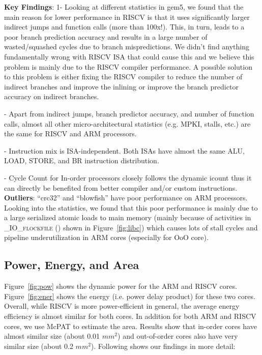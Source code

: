 \noindent \textbf{Key Findings}: 1- Looking at different statistics in gem5, we found that the main reason for lower performance in RISCV is that it uses significantly larger indirect jumps and function calls (more than 100x!). This, in turn, leads to a poor branch prediction accuracy and results in a large number of wasted/squashed cycles due to branch mispredictions. We didn't find anything fundamentally wrong with RISCV ISA that could cause this and we believe this problem is mainly due to the RISCV compiler performance. A possible solution to this problem is either fixing the RISCV compiler to reduce the number of indirect branches and improve the inlining or improve the branch predictor accuracy on indirect branches. 

- Apart from indirect jumps, branch predictor accuracy, and number of function calls, almost all other micro-architectural statistics (e.g. MPKI, stalls, etc.) are the same for RISCV and ARM processors.

- Instruction mix is ISA-independent. Both ISAs have almost the same ALU, LOAD, STORE, and BR instruction distribution. 

- Cycle Count for In-order processors closely follows the dynamic icount thus it can directly be benefited from better compiler and/or custom instructions. \\

\noindent \textbf{Outliers}: ``crc32'' and ``blowfish'' have poor performance on ARM processors. Looking into the statistics, we found that this poor performance is mainly due to a large serialized atomic loads to main memory (mainly because of activities in \textsc{\_IO\_flockfile ()} shown in Figure~\ref{fig:libc}) which causes lots of stall cycles and pipeline underutilization in ARM cores (especially for OoO core). 

\subsection{Power, Energy, and Area}
Figure~\ref{fig:pow} shows the dynamic power for the ARM and RISCV cores. Figure~\ref{fig:ener} shows the energy (i.e. power delay product) for these two cores. Overall, while RISCV is more power-efficient in general, the average energy efficiency is almost similar for both cores. In addition for both ARM and RISCV cores, we use McPAT to estimate the area. Results show that in-order cores have almost similar size (about 0.01 $mm^2$) and out-of-order cores also have very similar size (about 0.2 $mm^2$). Following shows our findings in more detail:  

